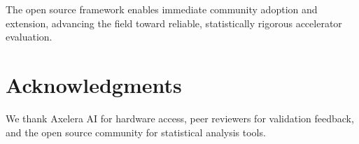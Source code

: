 \documentclass[sigconf]{acmart}
\begin{document}
The open source framework enables immediate community adoption and extension, advancing the field toward reliable, statistically rigorous accelerator evaluation.

\section*{Acknowledgments}

We thank Axelera AI for hardware access, peer reviewers for validation feedback, and the open source community for statistical analysis tools.



\end{document}
